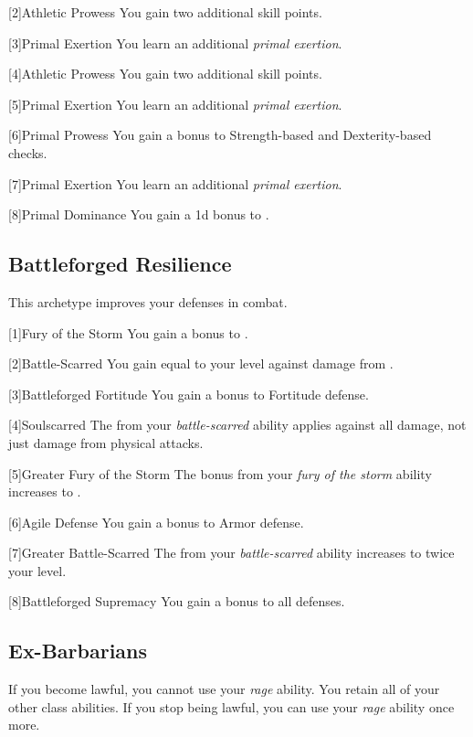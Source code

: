         [2]{Athletic Prowess} You gain two additional skill points.

        [3]{Primal Exertion}
        You learn an additional \textit{primal exertion}.

        [4]{Athletic Prowess} You gain two additional skill points.

        [5]{Primal Exertion}
        You learn an additional \textit{primal exertion}.

        [6]{Primal Prowess}
        You gain a  bonus to Strength-based and Dexterity-based checks.

        [7]{Primal Exertion}
        You learn an additional \textit{primal exertion}.

        [8]{Primal Dominance}
        You gain a \plus1d bonus to .

    \subsection{Battleforged Resilience}
        This archetype improves your defenses in combat.

        [1]{Fury of the Storm} You gain a  bonus to .

        [2]{Battle-Scarred} You gain  equal to your level against damage from .

        [3]{Battleforged Fortitude} You gain a  bonus to Fortitude defense.

        [4]{Soulscarred} The  from your \textit{battle-scarred} ability applies against all damage, not just damage from physical attacks.

        [5]{Greater Fury of the Storm}
        The bonus from your \textit{fury of the storm} ability increases to .

        [6]{Agile Defense}
        You gain a  bonus to Armor defense.

        [7]{Greater Battle-Scarred}
        The  from your \textit{battle-scarred} ability increases to twice your level.

        [8]{Battleforged Supremacy}
        You gain a  bonus to all defenses.

    \subsection{Ex-Barbarians}
        If you become lawful, you cannot use your \textit{rage} ability.
        You retain all of your other class abilities.
        If you stop being lawful, you can use your \textit{rage} ability once more.

